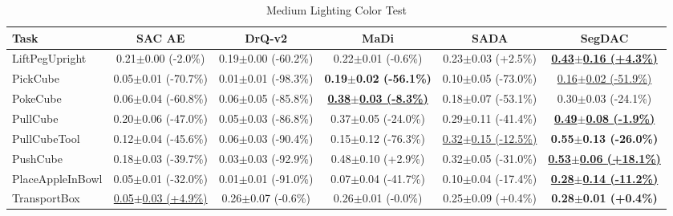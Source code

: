 \begin{table}[htbp]
\centering
\scriptsize
\caption{Medium Lighting Color Test}
\label{tab:appendix_lightingcolortest_medium}
\begin{adjustbox}{max width=\textwidth}
\begin{tabular}{l*{5}{c}}
\toprule
\textbf{Task} & \textbf{SAC AE} & \textbf{DrQ-v2} & \textbf{MaDi} & \textbf{SADA} & \textbf{SegDAC} \\
\midrule
LiftPegUpright & 0.21$\pm$0.00 \scriptsize{(-2.0\%)} & 0.19$\pm$0.00 \scriptsize{(-60.2\%)} & 0.22$\pm$0.01 \scriptsize{(-0.6\%)} & 0.23$\pm$0.03 \scriptsize{(+2.5\%)} & \textbf{\underline{0.43$\pm$0.16 \scriptsize{(+4.3\%)}}} \\
PickCube & 0.05$\pm$0.01 \scriptsize{(-70.7\%)} & 0.01$\pm$0.01 \scriptsize{(-98.3\%)} & \textbf{0.19$\pm$0.02 \scriptsize{(-56.1\%)}} & 0.10$\pm$0.05 \scriptsize{(-73.0\%)} & \underline{0.16$\pm$0.02 \scriptsize{(-51.9\%)}} \\
PokeCube & 0.06$\pm$0.04 \scriptsize{(-60.8\%)} & 0.06$\pm$0.05 \scriptsize{(-85.8\%)} & \textbf{\underline{0.38$\pm$0.03 \scriptsize{(-8.3\%)}}} & 0.18$\pm$0.07 \scriptsize{(-53.1\%)} & 0.30$\pm$0.03 \scriptsize{(-24.1\%)} \\
PullCube & 0.20$\pm$0.06 \scriptsize{(-47.0\%)} & 0.05$\pm$0.03 \scriptsize{(-86.8\%)} & 0.37$\pm$0.05 \scriptsize{(-24.0\%)} & 0.29$\pm$0.11 \scriptsize{(-41.4\%)} & \textbf{\underline{0.49$\pm$0.08 \scriptsize{(-1.9\%)}}} \\
PullCubeTool & 0.12$\pm$0.04 \scriptsize{(-45.6\%)} & 0.06$\pm$0.03 \scriptsize{(-90.4\%)} & 0.15$\pm$0.12 \scriptsize{(-76.3\%)} & \underline{0.32$\pm$0.15 \scriptsize{(-12.5\%)}} & \textbf{0.55$\pm$0.13 \scriptsize{(-26.0\%)}} \\
PushCube & 0.18$\pm$0.03 \scriptsize{(-39.7\%)} & 0.03$\pm$0.03 \scriptsize{(-92.9\%)} & 0.48$\pm$0.10 \scriptsize{(+2.9\%)} & 0.32$\pm$0.05 \scriptsize{(-31.0\%)} & \textbf{\underline{0.53$\pm$0.06 \scriptsize{(+18.1\%)}}} \\
PlaceAppleInBowl & 0.05$\pm$0.01 \scriptsize{(-32.0\%)} & 0.01$\pm$0.01 \scriptsize{(-91.0\%)} & 0.07$\pm$0.04 \scriptsize{(-41.7\%)} & 0.10$\pm$0.04 \scriptsize{(-17.4\%)} & \textbf{\underline{0.28$\pm$0.14 \scriptsize{(-11.2\%)}}} \\
TransportBox & \underline{0.05$\pm$0.03 \scriptsize{(+4.9\%)}} & 0.26$\pm$0.07 \scriptsize{(-0.6\%)} & 0.26$\pm$0.01 \scriptsize{(-0.0\%)} & 0.25$\pm$0.09 \scriptsize{(+0.4\%)} & \textbf{0.28$\pm$0.01 \scriptsize{(+0.4\%)}} \\
\bottomrule
\end{tabular}
\end{adjustbox}
\end{table}

